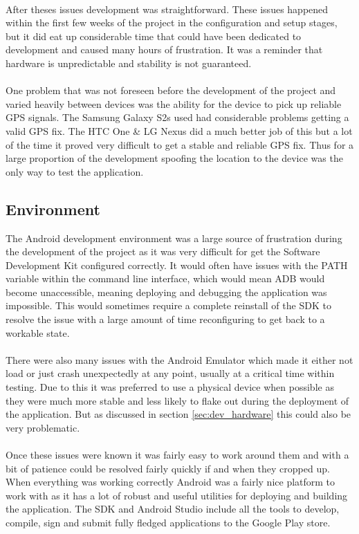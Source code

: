 \\
After theses issues development was straightforward. These issues happened within the first few weeks of the project in the configuration and setup stages, but it did eat up considerable time that could have been dedicated to development and caused many hours of frustration. It was a reminder that hardware is unpredictable and stability is not guaranteed.\\
\\
One problem that was not foreseen before the development of the project and varied heavily between devices was the ability for the device to pick up reliable GPS signals. The Samsung Galaxy S2s used had considerable problems getting a valid GPS fix. The HTC One \& LG Nexus did a much better job of this but a lot of the time it proved very difficult to get a stable and reliable GPS fix. Thus for a large proportion of the development spoofing the location to the device was the only way to test the application.

\subsection{Environment}

The Android development environment was a large source of frustration during the development of the project as it was very difficult for get the Software Development Kit configured correctly. It would often have issues with the PATH variable within the command line interface, which would mean ADB would become unaccessible, meaning deploying and debugging the application was impossible. This would sometimes require a complete reinstall of the SDK to resolve the issue with a large amount of time reconfiguring to get back to a workable state.\\
\\
There were also many issues with the Android Emulator which made it either not load or just crash unexpectedly at any point, usually at a critical time within testing. Due to this it was preferred to use a physical device when possible as they were much more stable and less likely to flake out during the deployment of the application. But as discussed in section \ref{sec:dev_hardware} this could also be very problematic.\\
\\
Once these issues were known it was fairly easy to work around them and with a bit of patience could be resolved fairly quickly if and when they cropped up. When everything was working correctly Android was a fairly nice platform to work with as it has a lot of robust and useful utilities for deploying and building the application. The SDK and Android Studio include all the tools to develop, compile, sign and submit fully fledged applications to the Google Play store.

